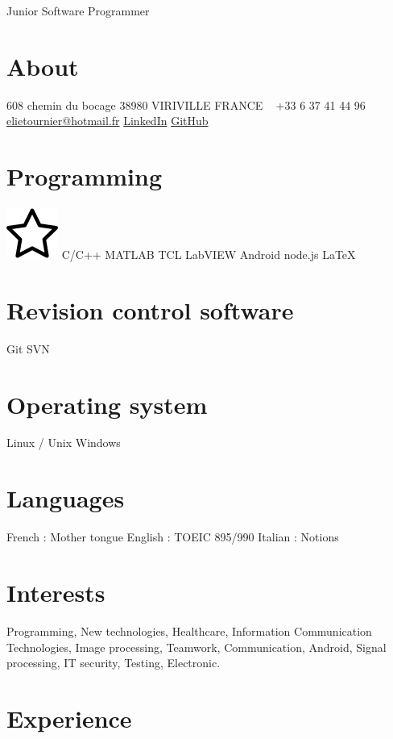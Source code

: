 \documentclass[]{Elie-cv}
\begin{document}
       {Junior Software Programmer}

\begin{aside}
  \section{About}
    608 chemin du bocage
    38980 VIRIVILLE
    FRANCE
    ~
    +33 6 37 41 44 96
    ~
    \href{mailto:elietournier@hotmail.fr}{elietournier@hotmail.fr}
    \href{https://fr.linkedin.com/in/elietournier}{LinkedIn}
    \href{https://github.com/Hopetech}{GitHub}
  \section{Programming}
   \includegraphics[scale=0.04]{Star.png} C/C++
    MATLAB 
    TCL
    LabVIEW
    Android
    node.js
    \LaTeX{} 
  \section{Revision control software}
    Git
    SVN
  \section{Operating system}
    Linux / Unix
    Windows
  \section{Languages}
    French : Mother tongue
    English : TOEIC 895/990
    Italian : Notions   
\end{aside}

\section{Interests}

Programming, New technologies, Healthcare, Information Communication Technologies, Image processing, Teamwork, Communication, Android, Signal processing, IT security, Testing, Electronic.   

\section{Experience}
\end{document}
